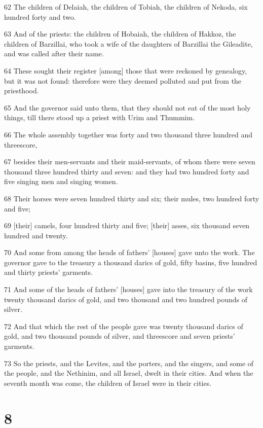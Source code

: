 \par 62 The children of Delaiah, the children of Tobiah, the children of Nekoda, six hundred forty and two.
\par 63 And of the priests: the children of Hobaiah, the children of Hakkoz, the children of Barzillai, who took a wife of the daughters of Barzillai the Gileadite, and was called after their name.
\par 64 These sought their register [among] those that were reckoned by genealogy, but it was not found: therefore were they deemed polluted and put from the priesthood.
\par 65 And the governor said unto them, that they should not eat of the most holy things, till there stood up a priest with Urim and Thummim.
\par 66 The whole assembly together was forty and two thousand three hundred and threescore,
\par 67 besides their men-servants and their maid-servants, of whom there were seven thousand three hundred thirty and seven: and they had two hundred forty and five singing men and singing women.
\par 68 Their horses were seven hundred thirty and six; their mules, two hundred forty and five;
\par 69 [their] camels, four hundred thirty and five; [their] asses, six thousand seven hundred and twenty.
\par 70 And some from among the heads of fathers' [houses] gave unto the work. The governor gave to the treasury a thousand darics of gold, fifty basins, five hundred and thirty priests' garments.
\par 71 And some of the heads of fathers' [houses] gave into the treasury of the work twenty thousand darics of gold, and two thousand and two hundred pounds of silver.
\par 72 And that which the rest of the people gave was twenty thousand darics of gold, and two thousand pounds of silver, and threescore and seven priests' garments.
\par 73 So the priests, and the Levites, and the porters, and the singers, and some of the people, and the Nethinim, and all Israel, dwelt in their cities. And when the seventh month was come, the children of Israel were in their cities.

\chapter{8}

